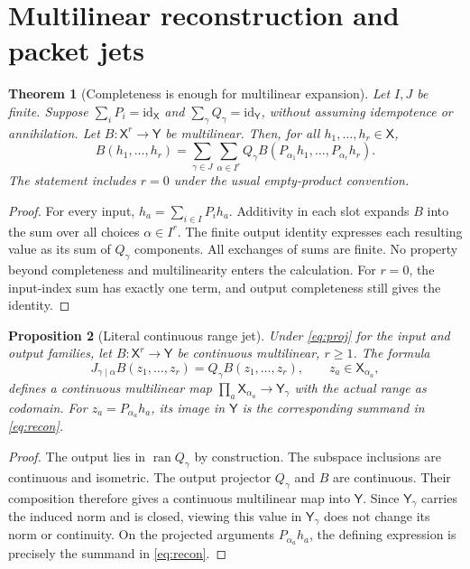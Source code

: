 \documentclass[11pt]{article}
\newtheorem{theorem}{Theorem}[section]
\newtheorem{proposition}[theorem]{Proposition}
\theoremstyle{remark}\newtheorem{remark}[theorem]{Remark}
\newcommand{\X}{\mathsf X}\newcommand{\Y}{\mathsf Y}\newcommand{\Z}{\mathsf Z}
\newcommand{\id}{\mathrm{id}}
\newcommand{\op}{\operatorname}
\begin{document}
\section{Multilinear reconstruction and packet jets}
\begin{theorem}[Completeness is enough for multilinear expansion]\label{thm:reconstruction}
Let $I,J$ be finite. Suppose $\sum_iP_i=\id_{\X}$ and $\sum_\gamma Q_\gamma=\id_{\Y}$, without assuming idempotence or annihilation. Let $B:\X^r\to\Y$ be multilinear. Then, for all $h_1,\ldots,h_r\in\X$,
\begin{equation}\label{eq:recon}
B(h_1,\ldots,h_r)=\sum_{\gamma\in J}\sum_{\alpha\in I^r}
Q_\gamma B(P_{\alpha_1}h_1,\ldots,P_{\alpha_r}h_r).
\end{equation}
The statement includes $r=0$ under the usual empty-product convention.
\end{theorem}
\begin{proof}
For every input, $h_a=\sum_{i\in I}P_i h_a$. Additivity in each slot expands $B$ into the sum over all choices $\alpha\in I^r$. The finite output identity expresses each resulting value as its sum of $Q_\gamma$ components. All exchanges of sums are finite. No property beyond completeness and multilinearity enters the calculation. For $r=0$, the input-index sum has exactly one term, and output completeness still gives the identity.
\end{proof}

\begin{proposition}[Literal continuous range jet]\label{prop:rangejet}
Under \eqref{eq:proj} for the input and output families, let $B:\X^r\to\Y$ be continuous multilinear, $r\ge1$. The formula
\[
J_{\gamma\mid\alpha}B(z_1,\ldots,z_r)
=Q_\gamma B(z_1,\ldots,z_r),\qquad z_a\in\X_{\alpha_a},
\]
defines a continuous multilinear map $\prod_a\X_{\alpha_a}\to\Y_\gamma$ with the actual range as codomain. For $z_a=P_{\alpha_a}h_a$, its image in $\Y$ is the corresponding summand in \eqref{eq:recon}.
\end{proposition}
\begin{proof}
The output lies in $\op{ran}Q_\gamma$ by construction. The subspace inclusions are continuous and isometric. The output projector $Q_\gamma$ and $B$ are continuous. Their composition therefore gives a continuous multilinear map into $\Y$. Since $\Y_\gamma$ carries the induced norm and is closed, viewing this value in $\Y_\gamma$ does not change its norm or continuity. On the projected arguments $P_{\alpha_a}h_a$, the defining expression is precisely the summand in \eqref{eq:recon}.
\end{proof}
\end{document}
